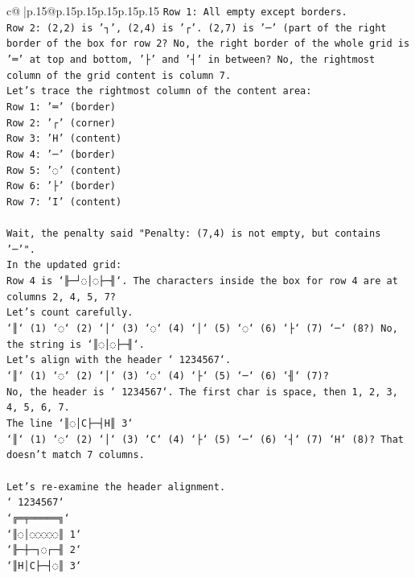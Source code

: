 \documentclass{article}
\begin{document}
{\begin{supertabular}{c@{$\;$}|p{.15\linewidth}@{}p{.15\linewidth}p{.15\linewidth}p{.15\linewidth}p{.15\linewidth}p{.15\linewidth}}
{{{\texttt{Row 1: All empty except borders.} \\
\texttt{Row 2: (2,2) is '┐', (2,4) is '┌'. (2,7) is '─' (part of the right border of the box for row 2? No, the right border of the whole grid is '═' at top and bottom, '├' and '┤' in between? No, the rightmost column of the grid content is column 7.} \\
\texttt{Let's trace the rightmost column of the content area:} \\
\texttt{Row 1: '═' (border)} \\
\texttt{Row 2: '┌' (corner)} \\
\texttt{Row 3: 'H' (content)} \\
\texttt{Row 4: '─' (border)} \\
\texttt{Row 5: '◌' (content)} \\
\texttt{Row 6: '├' (border)} \\
\texttt{Row 7: 'I' (content)} \\
\\ 
\texttt{Wait, the penalty said "Penalty: (7,4) is not empty, but contains '─'".} \\
\texttt{In the updated grid:} \\
\texttt{Row 4 is `╟─┘◌│◌├─╢`. The characters inside the box for row 4 are at columns 2, 4, 5, 7?} \\
\texttt{Let's count carefully.} \\
\texttt{`║` (1) `◌` (2) `│` (3) `◌` (4) `│` (5) `◌` (6) `├` (7) `─` (8?) No, the string is `║◌│◌├─╢`.} \\
\texttt{Let's align with the header ` 1234567`.} \\
\texttt{`║` (1) `◌` (2) `│` (3) `◌` (4) `├` (5) `─` (6) `╢` (7)?} \\
\texttt{No, the header is ` 1234567`. The first char is space, then 1, 2, 3, 4, 5, 6, 7.} \\
\texttt{The line `║◌│C├─┤H║ 3`} \\
\texttt{`║` (1) `◌` (2) `│` (3) `C` (4) `├` (5) `─` (6) `┤` (7) `H` (8)? That doesn't match 7 columns.} \\
\\ 
\texttt{Let's re{-}examine the header alignment.} \\
\texttt{` 1234567`} \\
\texttt{`╔═╤═════╗`} \\
\texttt{`║◌│◌◌◌◌◌║ 1`} \\
\texttt{`╟─┼─┐◌┌─╢ 2`} \\
\texttt{`║H│C├─┤◌║ 3`} \\
}}}
\end{supertabular}}
\end{document}

